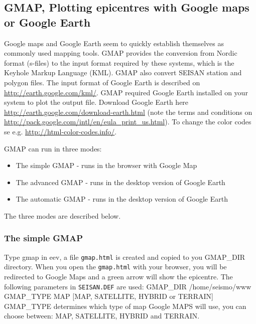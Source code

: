 
\subsection{GMAP, Plotting epicentres with Google maps or Google Earth} 
\label{subs:gmap}

Google maps and Google Earth seem to quickly establish themselves as 
commonly used mapping tools. GMAP provides the conversion from Nordic 
format (s-files) to the input format required by these systems, 
which is the Keyhole Markup Language (KML). 
GMAP also convert SEISAN station and polygon files.
The input format of 
Google Earth is described on \url{http://earth.google.com/kml/}. 
GMAP required Google Earth installed on your system to plot 
the output file. Download Google Earth here 
\url{http://earth.google.com/download-earth.html} 
(note the terms and conditions on 
\url{http://pack.google.com/intl/en/eula\_print\_us.html}). 
To change the color codes se e.g. \url{http://html-color-codes.info/}.


GMAP can run in three modes: 
\begin{itemize}
\item The simple GMAP - runs in the browser with Google Map
\item The advanced GMAP - runs in the desktop version of Google Earth
\item The automatic GMAP - runs in the desktop version of Google Earth
\end{itemize}
The three modes are described below.

\subsubsection{The simple GMAP}
Type gmap in eev, a file \texttt{gmap.html} is created and copied to you 
GMAP\_DIR directory. When you open the \texttt{gmap.html} with your 
browser, you will be redirected to Google Maps and a green arrow will 
show the epicentre. The following parameters in \texttt{SEISAN.DEF} are used:
GMAP\_DIR /home/seismo/www\newline
GMAP\_TYPE MAP [MAP, SATELLITE, HYBRID or TERRAIN]\newline
GMAP\_TYPE determines which type of map Google MAPS will use, 
you can choose between: MAP, SATELLITE, HYBRID and TERRAIN. 

